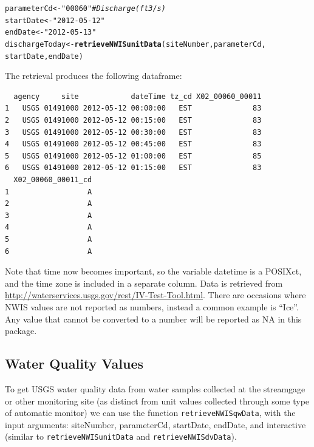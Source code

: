 \documentclass[a4paper,11pt]{article}\usepackage[]{graphicx}\usepackage[]{color}
\makeatletter
\newcommand{\hlstr}[1]{\textcolor[rgb]{0.192,0.494,0.8}{#1}}%
\newcommand{\hlcom}[1]{\textcolor[rgb]{0.678,0.584,0.686}{\textit{#1}}}%
\newcommand{\hlstd}[1]{\textcolor[rgb]{0.345,0.345,0.345}{#1}}%
\newcommand{\hlkwb}[1]{\textcolor[rgb]{0.69,0.353,0.396}{#1}}%
\newcommand{\hlkwd}[1]{\textcolor[rgb]{0.737,0.353,0.396}{\textbf{#1}}}%
\newenvironment{kframe}{%
 \def\at@end@of@kframe{}%
 \ifinner\ifhmode%
  \def\at@end@of@kframe{\end{minipage}}%
  \begin{minipage}{\columnwidth}%
 \fi\fi%
 \def\FrameCommand##1{\hskip\@totalleftmargin \hskip-\fboxsep
 \colorbox{shadecolor}{##1}\hskip-\fboxsep
     \hskip-\linewidth \hskip-\@totalleftmargin \hskip\columnwidth}%
 \MakeFramed {\advance\hsize-\width
   \@totalleftmargin\z@ \linewidth\hsize
   \@setminipage}}%
 {\par\unskip\endMakeFramed%
 \at@end@of@kframe}
\newenvironment{knitrout}{}{} %
\makeatother
\begin{document}
\begin{knitrout}
\color{fgcolor}\begin{kframe}
\begin{alltt}
\hlstd{parameterCd} \hlkwb{<-} \hlstr{"00060"}  \hlcom{# Discharge (ft3/s)}
\hlstd{startDate} \hlkwb{<-} \hlstr{"2012-05-12"}
\hlstd{endDate} \hlkwb{<-} \hlstr{"2012-05-13"}
\hlstd{dischargeToday} \hlkwb{<-} \hlkwd{retrieveNWISunitData}\hlstd{(siteNumber, parameterCd,}
        \hlstd{startDate, endDate)}
\end{alltt}
\end{kframe}
\end{knitrout}

The retrieval produces the following dataframe:

\begin{knitrout}
\color{fgcolor}\begin{kframe}
\begin{verbatim}
  agency     site            dateTime tz_cd X02_00060_00011
1   USGS 01491000 2012-05-12 00:00:00   EST              83
2   USGS 01491000 2012-05-12 00:15:00   EST              83
3   USGS 01491000 2012-05-12 00:30:00   EST              83
4   USGS 01491000 2012-05-12 00:45:00   EST              83
5   USGS 01491000 2012-05-12 01:00:00   EST              85
6   USGS 01491000 2012-05-12 01:15:00   EST              83
  X02_00060_00011_cd
1                  A
2                  A
3                  A
4                  A
5                  A
6                  A
\end{verbatim}
\end{kframe}
\end{knitrout}

Note that time now becomes important, so the variable datetime is a POSIXct, and the time zone is included in a separate column. Data is retrieved from \url{http://waterservices.usgs.gov/rest/IV-Test-Tool.html}. There are occasions where NWIS values are not reported as numbers, instead a common example is \enquote{Ice}.  Any value that cannot be converted to a number will be reported as NA in this package.

\newpage


\FloatBarrier

\subsection{Water Quality Values}
\label{sec:usgsWQP}
To get USGS water quality data from water samples collected at the streamgage or other monitoring site (as distinct from unit values collected through some type of automatic monitor) we can use the function \texttt{retrieveNWISqwData}, with the input arguments: siteNumber, parameterCd, startDate, endDate, and interactive (similar to \texttt{retrieveNWISunitData} and \texttt{retrieveNWISdvData}).
\end{document}
